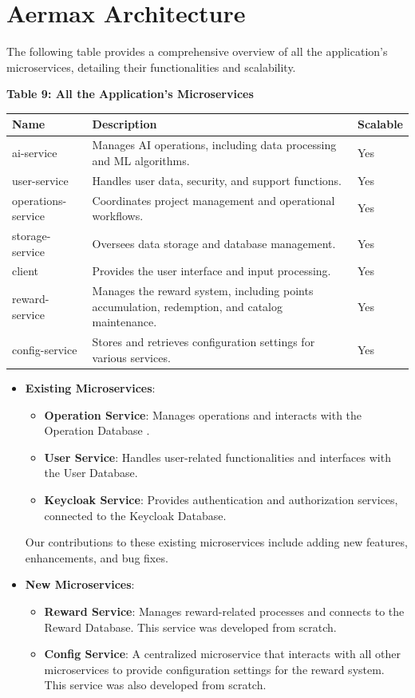 \section{Aermax Architecture}

The following table provides a comprehensive overview of all the application's microservices, detailing their functionalities and scalability.

\textbf{Table 9: All the Application’s Microservices}
\begin{longtable}{|p{3cm}|p{7cm}|p{2cm}|}
    \hline
    \textbf{Name} & \textbf{Description} & \textbf{Scalable} \\
    \hline
    \endhead
    ai-service & Manages AI operations, including data processing and ML algorithms. & Yes \\
    \hline
    user-service & Handles user data, security, and support functions. & Yes \\
    \hline
    operations-service & Coordinates project management and operational workflows. & Yes \\
    \hline
    storage-service & Oversees data storage and database management. & Yes \\
    \hline
    client & Provides the user interface and input processing. & Yes \\
    \hline
    reward-service & Manages the reward system, including points accumulation, redemption, and catalog maintenance. & Yes \\
    \hline
    config-service & Stores and retrieves configuration settings for various services. & Yes \\
    \hline
\end{longtable}

\begin{itemize}
    \item \textbf{Existing Microservices}:
    \begin{itemize}
        \item \textbf{Operation Service}: Manages operations and interacts with the Operation Database .
        \item \textbf{User Service}: Handles user-related functionalities and interfaces with the User Database.
        \item \textbf{Keycloak Service}: Provides authentication and authorization services, connected to the Keycloak Database.
    \end{itemize}
    Our contributions to these existing microservices include adding new features, enhancements, and bug fixes.
    \item \textbf{New Microservices}:
    \begin{itemize}
        \item \textbf{Reward Service}: Manages reward-related processes and connects to the Reward Database. This service was developed from scratch.
        \item \textbf{Config Service}: A centralized microservice that interacts with all other microservices to provide configuration settings for the reward system. This service was also developed from scratch.
    \end{itemize}
\end{itemize}

